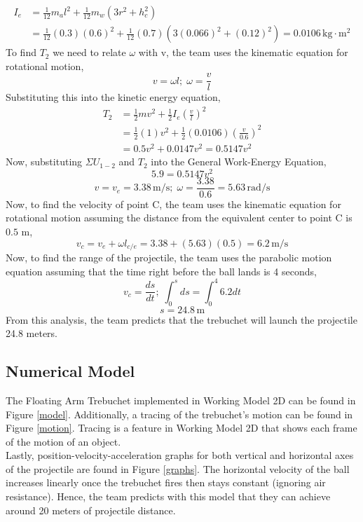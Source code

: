 \documentclass[12pt, titlepage]{article}
\begin{document}
    \begin{align*}
        I_e &= \frac{1}{12}m_al^2 + \frac{1}{12}m_w(3r^2 + h_c^2) \\
        &= \frac{1}{12}(0.3)(0.6)^2 + \frac{1}{12}(0.7)\left(3(0.066)^2 + (0.12)^2\right) = 0.0106 \, \mathrm{kg} \cdot \mathrm{m}^2
    \end{align*}
    To find $T_2$ we need to relate $\omega$ with v, the team uses the kinematic equation for rotational motion,
    $$v = \omega l;\; \omega = \frac{v}{l}$$
    Substituting this into the kinetic energy equation,
    \begin{align*}
        T_2 &= \frac{1}{2}mv^2 + \frac{1}{2}I_e\left(\frac{v}{l}\right)^2 \\
        &= \frac{1}{2}(1)v^2 + \frac{1}{2}(0.0106)\left(\frac{v}{0.6}\right)^2 \\
        &= 0.5v^2 + 0.0147v^2 = 0.5147v^2
    \end{align*}
    Now, substituting $\Sigma U_{1-2}$ and $T_2$ into the General Work-Energy Equation,
    $$5.9 = 0.5147v^2$$
    $$v = v_e = 3.38 \, \mathrm{m/s};\; \omega = \frac{3.38}{0.6} = 5.63 \, \mathrm{rad/s}$$
    Now, to find the velocity of point C, the team uses the kinematic equation for rotational motion assuming the distance from the equivalent center to point C is $0.5$ m,
    $$v_c = v_e + \omega l_{c/e} = 3.38 + (5.63)(0.5) = 6.2 \, \mathrm{m/s}$$
    Now, to find the range of the projectile, the team uses the parabolic motion equation assuming that the time right before the ball lands is 4 seconds,
    $$v_c = \frac{ds}{dt};\; \displaystyle\int_{0}^{s}ds = \displaystyle\int_{0}^{4}6.2dt$$
    \[ \boxed{s = 24.8 \, \mathrm{m}} \]
    From this analysis, the team predicts that the trebuchet will launch the projectile 24.8 meters.
    \newpage
    \subsection{Numerical Model}
    The Floating Arm Trebuchet implemented in Working Model 2D can be found 
    in Figure \ref{model}. Additionally, a tracing of the trebuchet's motion 
    can be found in Figure \ref{motion}. Tracing is a feature in Working 
    Model 2D that shows each frame of the motion of an object.\\[10pt]
    Lastly, position-velocity-acceleration graphs for both vertical and 
    horizontal axes of the projectile are found in Figure \ref{graphs}.
    The horizontal velocity of the ball increases linearly once the trebuchet fires
    then stays constant (ignoring air resistance). Hence, the team predicts 
    with this model that they can achieve around 20 meters of projectile
    distance.
\end{document}
